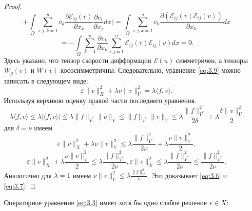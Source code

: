 \begin{proof}
$$+\int\limits_{\Omega}\sum_{i,j,k=1}^nv_k\frac{\partial\mathcal{E}_{ij}(v)}{\partial x_k}\frac{\partial v_i}{\partial x_j}dx\bigg)=
\int\limits_{\Omega}\sum_{i,j,k=1}^n v_k\frac{\partial (\mathcal{E}_{ij}(v)\mathcal{E}_{ij}(v))}{\partial x_k}dx$$
$$=-\int\limits_{\Omega}\sum_{k=1}^n \frac{\partial v_k}{\partial x_k}\sum_{i,j=1}^n\mathcal{E}_{ij}(v)\mathcal{E}_{ij}(v)dx=0.$$
Здесь указано, что тензор скорости дифформации $\mathcal{E}(u)$ симметричен, а тензоры $W_{\rho}(v)$ и $W(v)$ кососимметричны. 
Следовательно, уравнение \ref{eq:3.9} можно записать в следующем виде:
$$\varepsilon\|v\|^2_X+\lambda\nu\|v\|^2_V=\lambda\langle f,v\rangle.$$
Используя верхнюю оценку правой части последнего уравнения.
$$\lambda\langle f,v\rangle\leqslant\lambda |\langle f,v\rangle|\leqslant\lambda\|f\|_{V^*}\|v\|_V\leqslant\|f\|_{V^*}\|v\|_V\leqslant
\lambda\frac{\|f\|_{V^*}^2}{2\delta}+\lambda\frac{\delta\|v\|_V^2}{2}$$
для $\delta=\nu$ имеем
$$\varepsilon\|v\|^2_X+\lambda\nu\|v\|^2_V\leqslant\lambda\frac{\|f\|^2_{V^*}}{2\nu}+\lambda\frac{\nu\|v\|^2_V}{2},$$
$$\varepsilon\|v\|^2_X+\lambda\frac{\nu\|v\|^2_V}{2}\leqslant\lambda\frac{\|f\|^2_{V^*}}{2\nu}, \varepsilon\|v\|^2_X\leqslant\lambda
\frac{\|f\|^2_{V^*}}{2\nu}\leqslant\frac{\|f\|^2_{V^*}}{2\nu}.$$
Аналогично для $\lambda=1$ имеем $\nu\|v\|^2_V\leqslant\lambda\frac{\|f\|^2_{V^*}}{\nu}$. Это доказывает \ref{eq:3.6} и \ref{eq:3.7}.
\end{proof}

\begin{theorem}
    Операторное уравнение \ref{eq:3.3} имеет хотя бы одно слабое решение $v\in X:$
\end{theorem}

